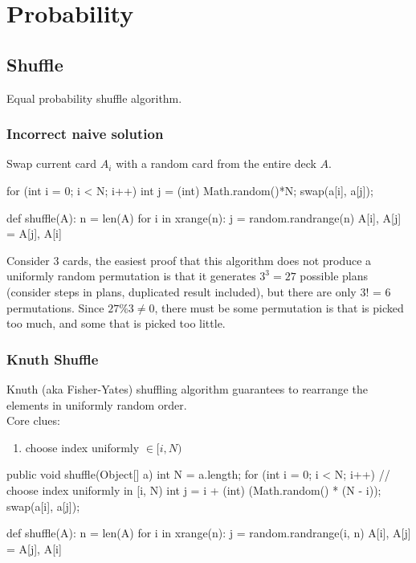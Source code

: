 \chapter{Probability}


\section{Shuffle}
Equal probability shuffle algorithm.

\subsection{Incorrect naive solution}
Swap current card $A_i$ with a random card from the entire deck $A$. 
\begin{java}
for (int i = 0; i < N; i++) {
   int j = (int) Math.random()*N;
   swap(a[i], a[j]);
}
\end{java}
\begin{python}
def shuffle(A):
  n = len(A)
  for i in xrange(n):
    j = random.randrange(n)
    A[i], A[j] = A[j], A[i]
\end{python}
Consider 3 cards, the easiest proof that this algorithm does not produce a uniformly random permutation is that it generates $3^3=27$ possible plans (consider steps in plans, duplicated result included), but there are only 3! = 6 permutations. Since $27\%3 \neq 0$, there must be some permutation is that is picked too much, and some that is picked too little.
\subsection{Knuth Shuffle}
Knuth (aka Fisher-Yates) shuffling algorithm guarantees to rearrange the elements in uniformly random order. 
\\
Core clues:
\begin{enumerate}
\item choose index uniformly $\in [i, N)$
\end{enumerate}
\begin{java}
public void shuffle(Object[] a) {
    int N = a.length;
    for (int i = 0; i < N; i++) {
        // choose index uniformly in [i, N)
        int j = i + (int) (Math.random() * (N - i));
        swap(a[i], a[j]);
    }
}
\end{java}

\begin{python}
def shuffle(A):
  n = len(A)
  for i in xrange(n):
    j = random.randrange(i, n)
    A[i], A[j] = A[j], A[i]
\end{python}

